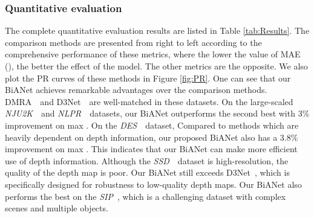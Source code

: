\documentclass[journal]{IEEEtran}
\newcommand{\tabref}[1]{Table \ref{#1}}
\newcommand{\figref}[1]{Figure \ref{#1}}
\newcommand{\DMRA}{DMRA~\cite{piao2019depth}}
\newcommand{\DTNet}{D3Net~\cite{fan2019D3Net}}
\newcommand{\NJU}{\textit{NJU2K}~\cite{ju2014depth}}
\newcommand{\NLPR}{\textit{NLPR}~\cite{peng2014rgbd}}
\newcommand{\DES}{\textit{DES}~\cite{cheng2014depth}}
\newcommand{\SSD}{\textit{SSD}~\cite{zhu2017three}}
\newcommand{\SIP}{\textit{SIP}~\cite{fan2019D3Net}}
\begin{document}
\subsubsection{Quantitative evaluation}
The complete quantitative evaluation results are listed in \tabref{tab:Results}.
The comparison methods are presented from right to left according to the comprehensive performance of these metrics,
where the lower the value of MAE (), the better the effect of the model.
The other metrics are the opposite.
We also plot the PR curves of these methods in \figref{fig:PR}.
One can see that our BiANet achieves remarkable advantages over the comparison methods.
\DMRA~and \DTNet~are well-matched in these datasets.
On the large-scaled \NJU~and \NLPR~datasets, our BiANet outperforms the second best with 3\% improvement on max .
On the \DES~dataset, Compared to methods which are heavily dependent on depth information,
our proposed BiANet also has a 3.8\% improvement on max .
This indicates that our BiANet can make more efficient use of depth information.
Although the \SSD~dataset is high-resolution, the quality of the depth map is poor.
Our BiANet still exceeds \DTNet, which is specifically designed for robustness to low-quality depth maps.
Our BiANet also performs the best on the \SIP, which is a challenging dataset with complex scenes and multiple objects.
\end{document}
